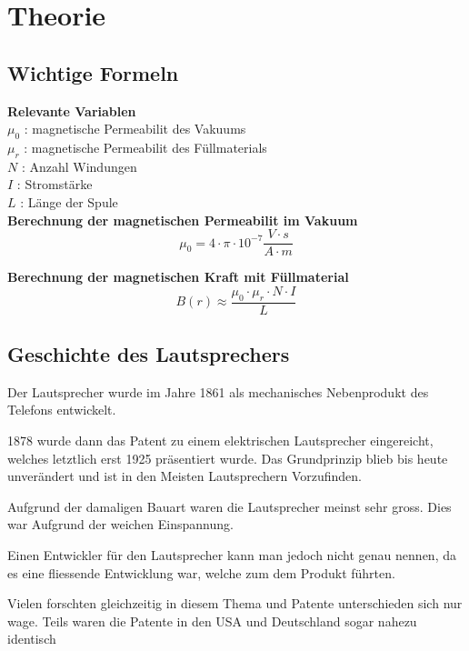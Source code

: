 \documentclass{report}
\begin{document}
\section{Theorie}
\subsection{Wichtige Formeln}

\textbf{Relevante Variablen} \\
\(\mu_0\) : magnetische Permeabilit des Vakuums \\
\(\mu_r\) : magnetische Permeabilit des Füllmaterials \\
\(N\) : Anzahl Windungen \\
\(I\) : Stromstärke \\
\(L\) : Länge der Spule \\

\textbf{Berechnung der magnetischen Permeabilit im Vakuum}
\begin{equation}
    \mu_0 = 4 \cdot \pi \cdot 10^{-7} \frac{V \cdot s}{A \cdot m}
\end{equation}

\textbf{Berechnung der magnetischen Kraft mit Füllmaterial}
\begin{equation}
    B(r) \approx \frac{\mu_0 \cdot \mu_r \cdot N \cdot I}{L}
\end{equation}

\subsection{Geschichte des Lautsprechers}
Der Lautsprecher wurde im Jahre 1861 als mechanisches Nebenprodukt des Telefons entwickelt.

1878 wurde dann das Patent zu einem elektrischen Lautsprecher eingereicht, welches letztlich erst 1925 präsentiert wurde.
Das Grundprinzip blieb bis heute unverändert und ist in den Meisten Lautsprechern Vorzufinden. \cite{history_wikipedia}

Aufgrund der damaligen Bauart waren die Lautsprecher meinst sehr gross. Dies war Aufgrund der weichen Einspannung. \cite{history_connect}

Einen Entwickler für den Lautsprecher kann man jedoch nicht genau nennen, da es eine fliessende Entwicklung war, welche zum dem Produkt führten.

Vielen forschten gleichzeitig in diesem Thema und Patente unterschieden sich nur wage. Teils waren die Patente in den USA und Deutschland sogar nahezu identisch
\end{document}
